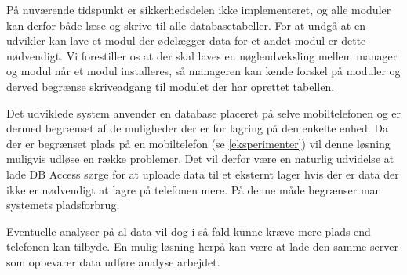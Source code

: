 På nuværende tidspunkt er sikkerhedsdelen ikke implementeret, og alle moduler kan derfor både læse og skrive til alle databasetabeller.
For at undgå at en udvikler kan lave et modul der ødelægger data for et andet modul er dette nødvendigt.
Vi forestiller os at der skal laves en nøgleudveksling mellem manager og modul når et modul installeres, så manageren kan kende forskel på moduler og derved begrænse skriveadgang til modulet der har oprettet tabellen.

Det udviklede system anvender en database placeret på selve mobiltelefonen og er dermed begrænset af de muligheder der er for lagring på den enkelte enhed.
Da der er begrænset plads på en mobiltelefon (se \cref{eksperimenter}) vil denne løsning muligvis udløse en række problemer.
Det vil derfor være en naturlig udvidelse at lade  DB Access sørge for at uploade data til et eksternt lager hvis der er data der ikke er nødvendigt at lagre på telefonen mere.
På denne måde begrænser man systemets pladsforbrug.

Eventuelle analyser på al data vil dog i så fald kunne kræve mere plads end telefonen kan tilbyde.
En mulig løsning herpå kan være at lade den samme server som opbevarer data udføre analyse arbejdet.
